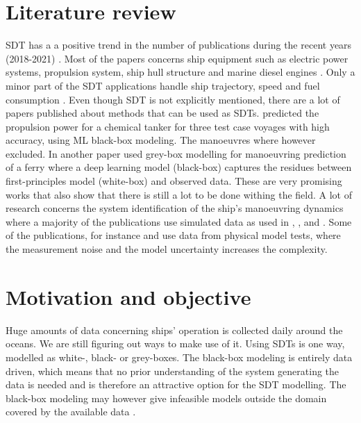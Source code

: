 

\section{Literature review}
SDT has a a positive trend in the number of publications during the recent years (2018-2021)  \cite{assani_ships_2022}. Most of the papers concerns ship equipment such as electric power systems, propulsion system, ship hull structure and marine diesel engines \cite{assani_ships_2022}. Only a minor part of the SDT applications handle ship trajectory, speed and fuel consumption \cite{assani_ships_2022}.   
Even though SDT is not explicitly mentioned, there are a lot of papers published about methods that can be used as SDTs. \cite{lang_comparison_2022} predicted the propulsion power for a chemical tanker for three test case voyages with high accuracy, using ML black-box modeling. The manoeuvres where however excluded. In another paper \cite{nielsen_machine_2022} used grey-box modelling for manoeuvring prediction of a ferry where a deep learning model (black-box) captures the residues between first-principles model (white-box) and observed data. These are very promising works that also show that there is still a lot to be done withing the field. 
A lot of research concerns the system identification of the ship's manoeuvring dynamics where a majority of the publications use simulated data as used in 
\cite{shi_identification_2009}, \cite{perera_system_2015}, \cite{zhu_parameter_2017} and \cite{wang_parameter_2021}. Some of the publications, for instance \cite{luo_parameter_2016} and \cite{he_nonparametric_2022} use data from physical model tests, where the measurement noise and the model uncertainty increases the complexity. 


\section{Motivation and objective}
\label{sec:motivation}
Huge amounts of data concerning ships' operation is collected daily around the oceans. We are still figuring out ways to make use of it. Using SDTs is one way, modelled as white-, black- or grey-boxes.
The black-box modeling is entirely data driven, which means that no prior understanding of the system generating the data is needed and is therefore an attractive option for the SDT modelling. The black-box modeling may however give infeasible models outside the domain covered by the available data \cite{nielsen_machine_2022}. 

